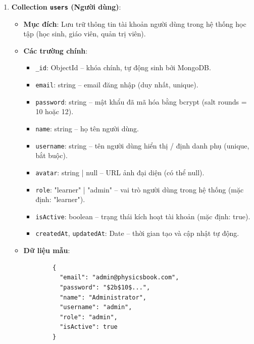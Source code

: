 \begin{enumerate}
    \item \textbf{Collection \texttt{users} (Người dùng)}:
    \begin{itemize}
        \item \textbf{Mục đích}: Lưu trữ thông tin tài khoản người dùng trong hệ thống học tập (học sinh, giáo viên, quản trị viên).
        
        \item \textbf{Các trường chính}:
        \begin{itemize}
            \item \texttt{\_id}: ObjectId – khóa chính, tự động sinh bởi MongoDB.
            
            \item \texttt{email}: string – email đăng nhập (duy nhất, unique).
            
            \item \texttt{password}: string – mật khẩu đã mã hóa bằng bcrypt (salt rounds = 10 hoặc 12).
            
            \item \texttt{name}: string – họ tên người dùng.
            
            \item \texttt{username}: string – tên người dùng hiển thị / định danh phụ (unique, bắt buộc).
            
            \item \texttt{avatar}: string | null – URL ảnh đại diện (có thể null).
            
            \item \texttt{role}: "learner" | "admin" – vai trò người dùng trong hệ thống (mặc định: "learner").
            
            \item \texttt{isActive}: boolean – trạng thái kích hoạt tài khoản (mặc định: true).
            
            \item \texttt{createdAt}, \texttt{updatedAt}: Date – thời gian tạo và cập nhật tự động.
        \end{itemize}
        
        \item \textbf{Dữ liệu mẫu}:
        \begin{verbatim}
        {
          "email": "admin@physicsbook.com",
          "password": "$2b$10$...",
          "name": "Administrator",
          "username": "admin",
          "role": "admin",
          "isActive": true
        }
        \end{verbatim}
    \end{itemize}


\end{enumerate}

